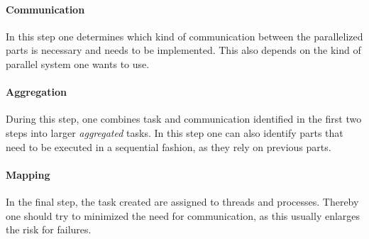 \documentclass{article}
\begin{document}
\paragraph{Communication} %
\label{par:communication}
	In this step one determines which kind of communication between the
	parallelized parts is necessary and needs to be implemented.
	This also depends on the kind of parallel system one wants to use.
\paragraph{Aggregation} %
\label{par:aggregation}
	During this step,
	one combines task and communication identified in the first two steps
	into larger \textsl{aggregated} tasks.
	In this step one can also identify parts that need to be executed in a sequential fashion,
	as they rely on previous parts.
\paragraph{Mapping} %
\label{par:mapping}
	In the final step,
	the task created are assigned to threads and processes.
	Thereby one should try to minimized the need for communication,
	as this usually enlarges the risk for failures.
\end{document}
